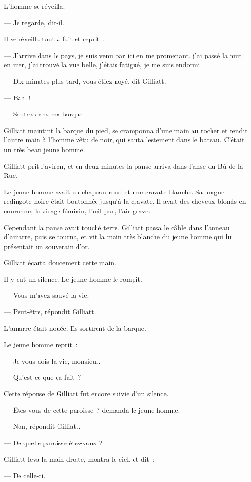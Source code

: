 \documentclass[french,twoside]{book} %
\begin{document}
L’homme se réveilla.\par
— Je regarde, dit-il.\par
Il se réveilla tout à fait et reprit :\par
— J’arrive dans le pays, je suis venu par ici en me promenant, j’ai passé la nuit en mer, j’ai trouvé la vue belle, j’étais fatigué, je me suis endormi.\par
— Dix minutes plus tard, vous étiez noyé, dit Gilliatt.\par
— Bah !\par
— Sautez dans ma barque.\par
Gilliatt maintint la barque du pied, se cramponna d’une main au rocher et tendit l’autre main à l’homme vêtu de noir, qui sauta lestement dans le bateau. C’était un très beau jeune homme.\par
Gilliatt prit l’aviron, et en deux minutes la panse arriva dans l’anse du Bû de la Rue.\par
Le jeune homme avait un chapeau rond et une cravate blanche. Sa longue redingote noire était boutonnée jusqu’à la cravate. Il avait des cheveux blonds  en couronne, le visage féminin, l’œil pur, l’air grave.\par
Cependant la panse avait touché terre. Gilliatt passa le câble dans l’anneau d’amarre, puis se tourna, et vit la main très blanche du jeune homme qui lui présentait un souverain d’or.\par
Gilliatt écarta doucement cette main.\par
Il y eut un silence. Le jeune homme le rompit.\par
— Vous m’avez sauvé la vie.\par
— Peut-être, répondit Gilliatt.\par
L’amarre était nouée. Ils sortirent de la barque.\par
Le jeune homme reprit :\par
— Je vous dois la vie, monsieur.\par
— Qu’est-ce que ça fait ?\par
Cette réponse de Gilliatt fut encore suivie d’un silence.\par
— Êtes-vous de cette paroisse ? demanda le jeune homme.\par
— Non, répondit Gilliatt.\par
— De quelle paroisse êtes-vous ?\par
Gilliatt leva la main droite, montra le ciel, et dit :\par
— De celle-ci.\par
\end{document}
